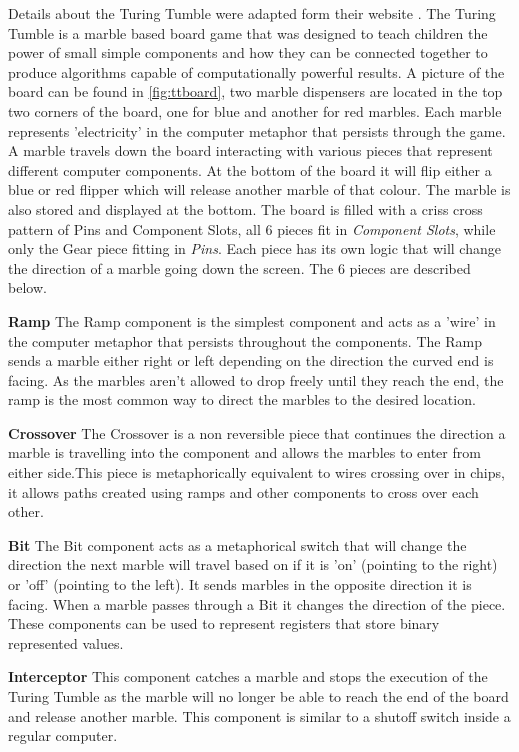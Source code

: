 \documentclass{l4proj}
\begin{document}
Details about the Turing Tumble were adapted form their website \citep{turing_tumble_site}. The Turing Tumble is a marble based board game that was designed to teach children the power of small simple components and how they can be connected together to produce algorithms capable of computationally powerful results. A picture of the board can be found in \ref{fig:ttboard}, two marble dispensers are located in the top two corners of the board, one for blue and another for red marbles. Each marble represents 'electricity' in the computer metaphor that persists through the game. A marble travels down the board interacting with various pieces that represent different computer components. At the bottom of the board it will flip either a blue or red flipper which will release another marble of that colour. The marble is also stored and displayed at the bottom. The board is filled with a criss cross pattern of Pins and Component Slots, all 6 pieces fit in \emph{Component Slots}, while only the Gear piece fitting in \emph{Pins}. Each piece has its own logic that will change the direction of a marble going down the screen. The 6 pieces are described below.

\textbf{Ramp}
The Ramp component is the simplest component and acts as a 'wire' in the computer metaphor that persists throughout the components. The Ramp sends a marble either right or left depending on the direction the curved end is facing. As the marbles aren't allowed to drop freely until they reach the end, the ramp is the most common way to direct the marbles to the desired location.

\textbf{Crossover}
The Crossover is a non reversible piece that continues the direction a marble is travelling into the component and allows the marbles to enter from either side.This piece is metaphorically equivalent to wires crossing over in chips, it allows paths created using ramps and other components to cross over each other.

\textbf{Bit}
The Bit component acts as a metaphorical switch that will change the direction the next marble will travel based on if it is 'on' (pointing to the right) or 'off' (pointing to the left). It sends marbles in the opposite direction it is facing. When a marble passes through a Bit it changes the direction of the piece. These components can be used to represent registers that store binary represented values.

\textbf{Interceptor}
This component catches a marble and stops the execution of the Turing Tumble as the marble will no longer be able to reach the end of the board and release another marble. This component is similar to a shutoff switch inside a regular computer. 
\end{document}

